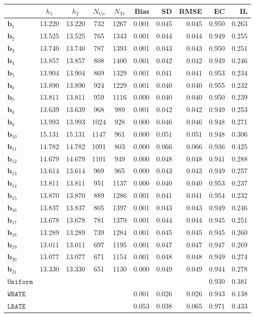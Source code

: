 \documentclass[10pt]{article}
\newcommand{\bb}{\mathbf{b}}
\begin{document}
\begin{table}[p]
    \centering
\begin{tabular}{lccccrrrrr}
\toprule\toprule
 & $h_1$ & $h_2$ & $N_{\mathrm{Co}}$ & $N_{\mathrm{Tr}}$ & Bias & SD & RMSE & EC & IL \\
\midrule
$\bb_{1}$ & 13.220 & 13.220 & 732 & 1267 & 0.001 & 0.045 & 0.045 & 0.950 & 0.263 \\
$\bb_{2}$ & 13.525 & 13.525 & 765 & 1343 & 0.001 & 0.044 & 0.044 & 0.949 & 0.255 \\
$\bb_{3}$ & 13.740 & 13.740 & 787 & 1393 & 0.001 & 0.043 & 0.043 & 0.950 & 0.251 \\
$\bb_{4}$ & 13.857 & 13.857 & 808 & 1400 & 0.001 & 0.042 & 0.042 & 0.949 & 0.246 \\
$\bb_{5}$ & 13.904 & 13.904 & 869 & 1329 & 0.001 & 0.041 & 0.041 & 0.953 & 0.234 \\
$\bb_{6}$ & 13.890 & 13.890 & 924 & 1229 & 0.001 & 0.040 & 0.040 & 0.955 & 0.232 \\
$\bb_{7}$ & 13.811 & 13.811 & 959 & 1116 & 0.000 & 0.040 & 0.040 & 0.950 & 0.239 \\
$\bb_{8}$ & 13.639 & 13.639 & 968 & 989 & 0.001 & 0.042 & 0.042 & 0.949 & 0.253 \\
$\bb_{9}$ & 13.993 & 13.993 & 1024 & 928 & 0.000 & 0.046 & 0.046 & 0.948 & 0.271 \\
$\bb_{10}$ & 15.131 & 15.131 & 1147 & 961 & 0.000 & 0.051 & 0.051 & 0.948 & 0.306 \\
$\bb_{11}$ & 14.782 & 14.782 & 1091 & 803 & 0.000 & 0.066 & 0.066 & 0.936 & 0.425 \\
$\bb_{12}$ & 14.679 & 14.679 & 1101 & 949 & 0.000 & 0.048 & 0.048 & 0.941 & 0.288 \\
$\bb_{13}$ & 13.614 & 13.614 & 969 & 965 & 0.000 & 0.043 & 0.043 & 0.949 & 0.257 \\
$\bb_{14}$ & 13.811 & 13.811 & 951 & 1137 & 0.000 & 0.040 & 0.040 & 0.953 & 0.237 \\
$\bb_{15}$ & 13.870 & 13.870 & 889 & 1286 & 0.001 & 0.041 & 0.041 & 0.954 & 0.232 \\
$\bb_{16}$ & 13.837 & 13.837 & 805 & 1397 & 0.001 & 0.043 & 0.043 & 0.949 & 0.246 \\
$\bb_{17}$ & 13.678 & 13.678 & 781 & 1379 & 0.001 & 0.044 & 0.044 & 0.945 & 0.251 \\
$\bb_{18}$ & 13.289 & 13.289 & 739 & 1284 & 0.001 & 0.045 & 0.045 & 0.945 & 0.260 \\
$\bb_{19}$ & 13.011 & 13.011 & 697 & 1195 & 0.001 & 0.047 & 0.047 & 0.947 & 0.269 \\
$\bb_{20}$ & 13.077 & 13.077 & 671 & 1154 & 0.001 & 0.048 & 0.048 & 0.949 & 0.274 \\
$\bb_{21}$ & 13.330 & 13.330 & 651 & 1130 & 0.000 & 0.049 & 0.049 & 0.944 & 0.278 \\
\midrule
$\mathtt{Uniform}$ &  &  &  &  &  &  &  & 0.930 & 0.381 \\
\midrule
$\mathtt{WBATE}$ &  &  &  &  & 0.001 & 0.026 & 0.026 & 0.943 & 0.138 \\
\midrule
$\mathtt{LBATE}$ &  &  &  &  & 0.053 & 0.038 & 0.065 & 0.971 & 0.433 \\
\bottomrule\bottomrule
\end{tabular}


\end{table}
\end{document}
